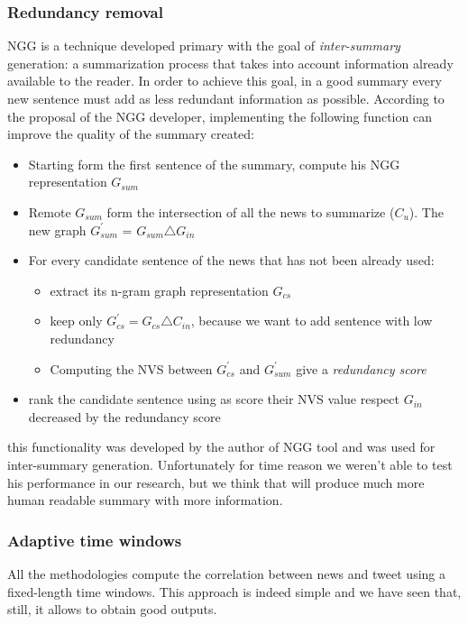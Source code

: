 \subsubsection*{Redundancy removal}
NGG is a technique developed primary with the goal of \emph{inter-summary} generation: a summarization process that takes into account information already available to the reader. In order to achieve this goal, in a good summary every new sentence must add as less redundant information as possible.
According to the proposal of the NGG developer, implementing the following function can improve the quality of the summary created:
\begin{itemize}
	\item Starting form the first sentence of the summary, compute his NGG representation $G_{sum}$
	\item Remote $G_{sum}$ form the intersection of all the news to summarize ($C_{u}$). The new graph $G_{sum}^{\prime}$ = $G_{sum} \triangle G_{in}$
	\item For every candidate sentence of the news that has not been already used:
	\begin{itemize}
		\item extract its n-gram graph representation $G_{cs}$
		\item keep only $G_{cs}^{\prime} = G_{cs} \triangle C_{in}$, because we want to add sentence with low redundancy
		\item Computing the NVS between $G_{cs}^{\prime}$ and $G_{sum}^{\prime}$ give a \emph{redundancy score}
	\end{itemize}
	\item rank the candidate sentence using as score their NVS value respect $G_{in}$ decreased by the redundancy score
\end{itemize}
this functionality was developed by the author of NGG tool and was used for inter-summary generation. Unfortunately for time reason we weren't able to test his performance in our research, but we think that will produce much more human readable summary with more information.

\subsubsection*{Adaptive time windows}
All the methodologies compute the correlation between news and tweet using a
fixed-length time windows. This approach is indeed simple and we have seen that,
still, it allows to obtain good outputs. 

